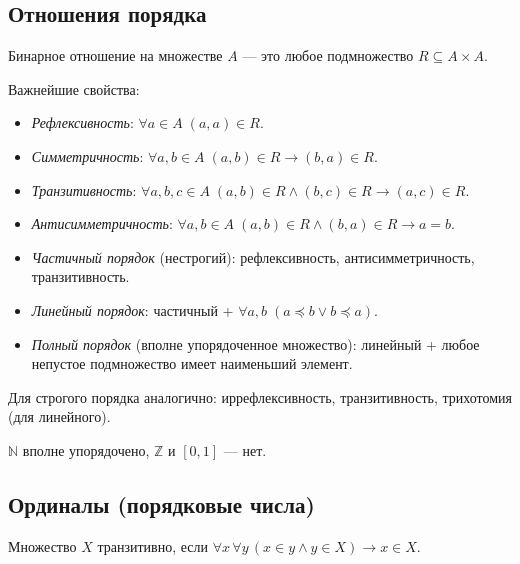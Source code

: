 \documentclass[10pt]{article}
\begin{document}
\subsection{Отношения порядка}
\begin{definition}
Бинарное отношение на множестве $A$ — это любое подмножество $R \subseteq A \times A$.
\end{definition}

Важнейшие свойства:
\begin{itemize}
    \item \emph{Рефлексивность}: $\forall a \in A \; (a,a) \in R$.
    \item \emph{Симметричность}: $\forall a,b \in A \; (a,b) \in R \rightarrow (b,a) \in R$.
    \item \emph{Транзитивность}: $\forall a,b,c \in A \; (a,b) \in R \land (b,c) \in R \rightarrow (a,c) \in R$.
    \item \emph{Антисимметричность}: $\forall a,b \in A \; (a,b) \in R \land (b,a) \in R \rightarrow a = b$.
\end{itemize}

\begin{definition}\;
\begin{itemize}
    \item \emph{Частичный порядок} (нестрогий): рефлексивность, антисимметричность, транзитивность.
    \item \emph{Линейный порядок}: частичный + $\forall a,b \; (a \preceq b \lor b \preceq a)$.
    \item \emph{Полный порядок} (вполне упорядоченное множество): линейный + любое непустое подмножество имеет наименьший элемент.
\end{itemize}
Для строгого порядка аналогично: иррефлексивность, транзитивность, трихотомия (для линейного).
\end{definition}

\begin{example}
$\mathbb{N}$ вполне упорядочено, $\mathbb{Z}$ и $[0,1]$ — нет.
\end{example}

\subsection{Ординалы (порядковые числа)}
\begin{definition}
Множество $X$ транзитивно, если $\forall x \, \forall y \, (x \in y \land y \in X) \rightarrow x \in X$.
\end{definition}
\end{document}
